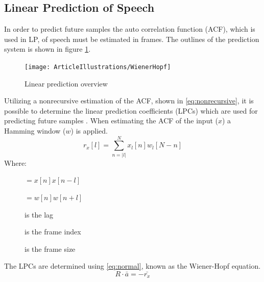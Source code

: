 \subsection{Linear Prediction of Speech}
In order to predict future samples the auto correlation function (ACF), which is used in LP, of speech must be estimated in frames. The outlines of the prediction system is shown in figure \ref{fig:LinearPredictionOverview}.

\begin{figure}[H]
	\centering
	\texttt{[image: ArticleIllustrations/WienerHopf]}
	\caption{Linear prediction overview}
	\label{fig:LinearPredictionOverview}
\end{figure}


Utilizing a nonrecursive estimation of the ACF, shown in \autoref{eq:nonrecursive}, it is possible to determine the linear prediction coefficients (LPCs) which are used for predicting future samples \cite{LinearPrediction}. When estimating the ACF of the input ($x$) a Hamming window ($w$) is applied.
\begin{equation}\label{eq:nonrecursive}
r_x[l] = \sum^{N}_{n=\left| l\right|} x_l[n]w_l[N-n]
\end{equation}
Where:
\vspace{-8mm}
\begin{description}
	\item[] $=x[n]x[n-l]$ 
	\item[] $=w[n]w[n+l]$
	\item[] is the lag 
	\item[] is the frame index
	\item[] is the frame size
\end{description}
The LPCs are determined using \autoref{eq:normal}, known as the Wiener-Hopf equation.
\begin{equation}\label{eq:normal}
R \cdot \bar{a} = -\bar{r_x}
\end{equation}
